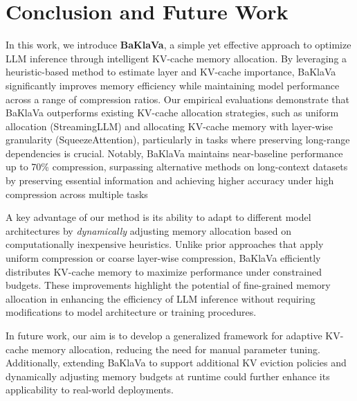 \section{Conclusion and Future Work \label{sec:conclusion}}


In this work, we introduce \textbf{BaKlaVa}, a simple yet effective approach to optimize LLM inference through intelligent KV-cache memory allocation. By leveraging a heuristic-based method to estimate layer and KV-cache importance, BaKlaVa significantly improves memory efficiency while maintaining model performance across a range of compression ratios. Our empirical evaluations demonstrate that BaKlaVa outperforms existing KV-cache allocation strategies, such as uniform allocation (StreamingLLM) and allocating KV-cache memory with layer-wise granularity (SqueezeAttention), particularly in tasks where preserving long-range dependencies is crucial. Notably, BaKlaVa maintains near-baseline performance up to 70\% compression, surpassing alternative methods on long-context datasets by preserving essential information and achieving higher accuracy under high compression across multiple tasks

A key advantage of our method is its ability to adapt to different model architectures by \textit{dynamically}  adjusting memory allocation based on computationally inexpensive heuristics. Unlike prior approaches that apply uniform compression or coarse layer-wise compression, BaKlaVa efficiently distributes KV-cache memory to maximize performance under constrained budgets. These improvements highlight the potential of fine-grained memory allocation in enhancing the efficiency of LLM inference without requiring modifications to model architecture or training procedures.


In future work, our aim is to develop a generalized framework for adaptive KV-cache memory allocation, reducing the need for manual parameter tuning. Additionally, extending BaKlaVa to support additional KV eviction policies and dynamically adjusting memory budgets at runtime could further enhance its applicability to real-world deployments.

